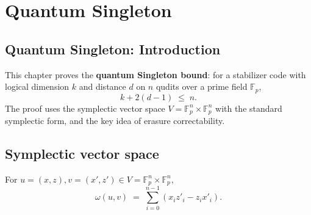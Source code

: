 \section{Quantum Singleton}
\label{chap:quantum-singleton}
\subsection*{Quantum Singleton: Introduction}

This chapter proves the \textbf{quantum Singleton bound}:
for a stabilizer code with logical dimension $k$ and distance $d$
on $n$ qudits over a prime field $\mathbb{F}_p$,
\[
k + 2(d-1) \;\le\; n.
\]
The proof uses the symplectic vector space $V = \mathbb{F}_p^n \times \mathbb{F}_p^n$
with the standard symplectic form, and the key idea of erasure correctability.

\subsection{Symplectic vector space}

\begin{definition}
\label{sym_form}
\leanok
{}
For $u = (x,z), v = (x',z') \in V = \mathbb{F}_p^n \times \mathbb{F}_p^n$,
\[
\omega(u,v) \;=\; \sum_{i=0}^{n-1}(x_i z'_i - z_i x'_i).
\]
\end{definition}

